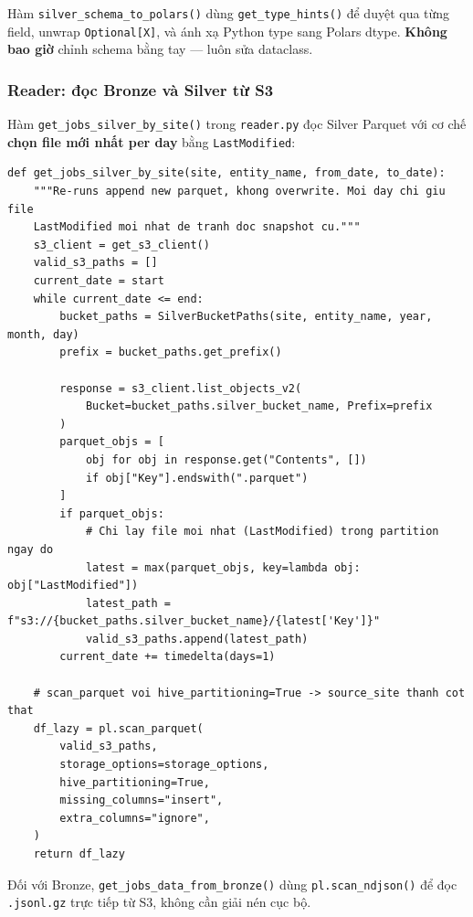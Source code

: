 Hàm \texttt{silver\_schema\_to\_polars()} dùng \texttt{get\_type\_hints()} để
duyệt qua từng field, unwrap \texttt{Optional[X]}, và ánh xạ Python type sang
Polars dtype. \textbf{Không bao giờ} chỉnh schema bằng tay --- luôn sửa dataclass.

\subsubsection{Reader: đọc Bronze và Silver từ S3}
\label{subsubsec:silver-reader}

Hàm \texttt{get\_jobs\_silver\_by\_site()} trong \texttt{reader.py} đọc Silver
Parquet với cơ chế \textbf{chọn file mới nhất per day} bằng \texttt{LastModified}:

\begin{lstlisting}[caption={\texttt{src/storage\_layer/MinIO\_S3/layer/silver/utils/reader.py} --- đọc Silver, chỉ lấy file mới nhất per day}, label={lst:silver-reader}]
def get_jobs_silver_by_site(site, entity_name, from_date, to_date):
    """Re-runs append new parquet, khong overwrite. Moi day chi giu file
    LastModified moi nhat de tranh doc snapshot cu."""
    s3_client = get_s3_client()
    valid_s3_paths = []
    current_date = start
    while current_date <= end:
        bucket_paths = SilverBucketPaths(site, entity_name, year, month, day)
        prefix = bucket_paths.get_prefix()

        response = s3_client.list_objects_v2(
            Bucket=bucket_paths.silver_bucket_name, Prefix=prefix
        )
        parquet_objs = [
            obj for obj in response.get("Contents", [])
            if obj["Key"].endswith(".parquet")
        ]
        if parquet_objs:
            # Chi lay file moi nhat (LastModified) trong partition ngay do
            latest = max(parquet_objs, key=lambda obj: obj["LastModified"])
            latest_path = f"s3://{bucket_paths.silver_bucket_name}/{latest['Key']}"
            valid_s3_paths.append(latest_path)
        current_date += timedelta(days=1)

    # scan_parquet voi hive_partitioning=True -> source_site thanh cot that
    df_lazy = pl.scan_parquet(
        valid_s3_paths,
        storage_options=storage_options,
        hive_partitioning=True,
        missing_columns="insert",
        extra_columns="ignore",
    )
    return df_lazy
\end{lstlisting}

Đối với Bronze, \texttt{get\_jobs\_data\_from\_bronze()} dùng
\texttt{pl.scan\_ndjson()} để đọc \texttt{.jsonl.gz} trực tiếp từ S3, không cần
giải nén cục bộ.

